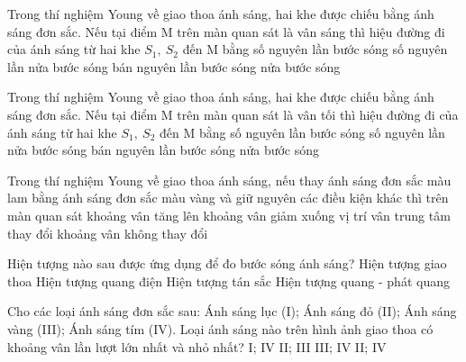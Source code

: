 \setcounter{paragraph}{0}
\setcounter{ex}{0}
\PhanI




\begin{ex}%
Trong thí nghiệm Young về giao thoa ánh sáng, hai khe được chiếu bằng ánh sáng đơn sắc. Nếu tại điểm M trên màn quan sát là vân sáng thì hiệu đường đi của ánh sáng từ hai khe ${S_1},\ {S_2} $ đến M bằng
\choice
{\True số nguyên lần bước sóng}
{số nguyên lần nửa bước sóng}
{bán nguyên lần bước sóng}
{nửa bước sóng}
\end{ex} 
\begin{ex}%
Trong thí nghiệm Young về giao thoa ánh sáng, hai khe được chiếu bằng ánh sáng đơn sắc. Nếu tại điểm M trên màn quan sát là vân tối thì hiệu đường đi của ánh sáng từ hai khe ${S_1},\ {S_2} $ đến M bằng
\choice
{số nguyên lần bước sóng}
{số nguyên lần nửa bước sóng}
{\True bán nguyên lần bước sóng}
{nửa bước sóng}
\end{ex} 
\begin{ex}%
Trong thí nghiệm Young về giao thoa ánh sáng, nếu thay ánh sáng đơn sắc màu lam bằng ánh sáng đơn sắc màu vàng và giữ nguyên các điều kiện khác thì trên màn quan sát
\choice
{\True khoảng vân tăng lên}
{khoảng vân giảm xuống}
{vị trí vân trung tâm thay đổi}
{khoảng vân không thay đổi}
\end{ex} 
\begin{ex}%
Hiện tượng nào sau được ứng dụng để đo bước sóng ánh sáng?
\choice
{\True Hiện tượng giao thoa}
{Hiện tượng quang điện}
{Hiện tượng tán sắc}
{Hiện tượng quang - phát quang}
\end{ex} 
\begin{ex}%
Cho các loại ánh sáng đơn sắc sau: Ánh sáng lục (I); Ánh sáng đỏ (II); Ánh sáng vàng (III); Ánh sáng tím (IV). Loại ánh sáng nào trên hình ảnh giao thoa có khoảng vân lần lượt lớn nhất và nhỏ nhất?
\choice
{I; IV}
{II; III}
{III; IV}
{\True II; IV}
\end{ex} 










